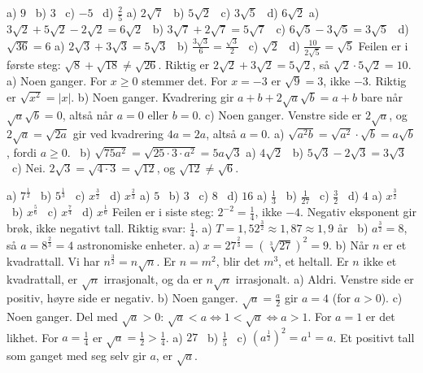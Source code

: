 
 a) $9$ \ b) $3$ \ c) $-5$ \ d) $\frac{2}{5}$
 a) $2\sqrt{7}$ \ b) $5\sqrt{2}$ \ c) $3\sqrt{5}$ \ d) $6\sqrt{2}$
 a) $3\sqrt{2}+5\sqrt{2}-2\sqrt{2} = 6\sqrt{2}$ \ b) $3\sqrt{7}+2\sqrt{7} = 5\sqrt{7}$ \ c) $6\sqrt{5}-3\sqrt{5} = 3\sqrt{5}$ \ d) $\sqrt{36} = 6$
 a) $2\sqrt{3}+3\sqrt{3} = 5\sqrt{3}$ \ b) $\frac{3\sqrt{3}}{6} = \frac{\sqrt{3}}{2}$ \ c) $\sqrt{2}$ \ d) $\frac{10}{2\sqrt{5}} = \sqrt{5}$
 Feilen er i første steg: $\sqrt{8}+\sqrt{18} \neq \sqrt{26}$. Riktig er $2\sqrt{2}+3\sqrt{2} = 5\sqrt{2}$, så $\sqrt{2}\cdot 5\sqrt{2} = 10$.
 a) Noen ganger. For $x \ge 0$ stemmer det. For $x = -3$ er $\sqrt{9} = 3$, ikke $-3$. Riktig er $\sqrt{x^2} = |x|$.
b) Noen ganger. Kvadrering gir $a + b + 2\sqrt{a}\sqrt{b} = a + b$ bare når $\sqrt{a}\sqrt{b} = 0$, altså når $a = 0$ eller $b = 0$.
c) Noen ganger. Venstre side er $2\sqrt{a}$, og $2\sqrt{a} = \sqrt{2a}$ gir ved kvadrering $4a = 2a$, altså $a = 0$.
 a) $\sqrt{a^2b} = \sqrt{a^2}\cdot\sqrt{b} = a\sqrt{b}$, fordi $a \ge 0$. \ b) $\sqrt{75a^2} = \sqrt{25\cdot3\cdot a^2} = 5a\sqrt{3}$
 a) $4\sqrt{2}$ \ b) $5\sqrt{3}-2\sqrt{3} = 3\sqrt{3}$ \ c) Nei. $2\sqrt{3} = \sqrt{4\cdot 3} = \sqrt{12}$, og $\sqrt{12} \neq \sqrt{6}$.

 a) $7^{\tfrac12}$ \ b) $5^{\tfrac13}$ \ c) $x^{\tfrac32}$ \ d) $x^{\tfrac23}$
 a) $5$ \ b) $3$ \ c) $8$ \ d) $16$
 a) $\frac{1}{3}$ \ b) $\frac{1}{27}$ \ c) $\frac{3}{2}$ \ d) $4$
 a) $x^{\tfrac32}$ \ b) $x^{\tfrac56}$ \ c) $x^{\tfrac74}$ \ d) $x^{\tfrac16}$
 Feilen er i siste steg: $2^{-2} = \frac{1}{4}$, ikke $-4$. Negativ eksponent gir brøk, ikke negativt tall. Riktig svar: $\frac{1}{4}$.
 a) $T = 1,52^{\tfrac32} \approx 1,87 \approx 1,9$ år \ b) $a^{\tfrac32} = 8$, så $a = 8^{\tfrac23} = 4$ astronomiske enheter.
 a) $x = 27^{\tfrac23} = (\sqrt[3]{27})^2 = 9$.
b) Når $n$ er et kvadrattall. Vi har $n^{\tfrac32} = n\sqrt{n}$. Er $n = m^2$, blir det $m^3$, et heltall. Er $n$ ikke et kvadrattall, er $\sqrt{n}$ irrasjonalt, og da er $n\sqrt{n}$ irrasjonalt.
 a) Aldri. Venstre side er positiv, høyre side er negativ.
b) Noen ganger. $\sqrt{a} = \frac{a}{2}$ gir $a = 4$ (for $a > 0$).
c) Noen ganger. Del med $\sqrt{a} > 0$: $\sqrt{a} < a \iff 1 < \sqrt{a} \iff a > 1$. For $a = 1$ er det likhet. For $a = \frac14$ er $\sqrt{a} = \frac12 > \frac14$.
 a) $27$ \ b) $\frac{1}{5}$ \ c) $(a^{\tfrac12})^2 = a^1 = a$. Et positivt tall som ganget med seg selv gir $a$, er $\sqrt{a}$.

